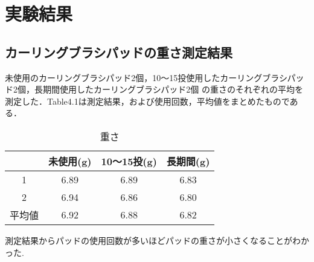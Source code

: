 \documentclass[main]{subfiles}
\begin{document}
\chapter{実験結果}
\section{カーリングブラシパッドの重さ測定結果}
未使用のカーリングブラシパッド2個，10～15投使用したカーリングブラシパッド2個，長期間使用したカーリングブラシパッド2個
の重さのそれぞれの平均を測定した．Table4.1は測定結果，および使用回数，平均値をまとめたものである．
\\   

\begin{table}
    \centering
    \caption{重さ}
    \label{table:tab}
  \begin{tabular}{c|c|c|c}

     & 未使用(g) & 10～15投(g) & 長期間(g)\\ \hline
    1 & 6.89 & 6.89 & 6.83\\ \hline
    2 & 6.94 & 6.86 & 6.80\\ \hline
    平均値& 6.92 & 6.88 & 6.82  \\
  \end{tabular}
\end{table}
測定結果からパッドの使用回数が多いほどパッドの重さが小さくなることがわかった.
\end{document}
